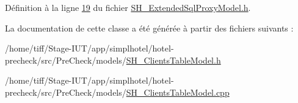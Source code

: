 Définition à la ligne \hyperlink{SH__ExtendedSqlProxyModel_8h_source_l00019}{19} du fichier \hyperlink{SH__ExtendedSqlProxyModel_8h_source}{S\-H\-\_\-\-Extended\-Sql\-Proxy\-Model.\-h}.



La documentation de cette classe a été générée à partir des fichiers suivants \-:\begin{DoxyCompactItemize}
\item 
/home/tiff/\-Stage-\/\-I\-U\-T/app/simplhotel/hotel-\/precheck/src/\-Pre\-Check/models/\hyperlink{SH__ClientsTableModel_8h}{S\-H\-\_\-\-Clients\-Table\-Model.\-h}\item 
/home/tiff/\-Stage-\/\-I\-U\-T/app/simplhotel/hotel-\/precheck/src/\-Pre\-Check/models/\hyperlink{SH__ClientsTableModel_8cpp}{S\-H\-\_\-\-Clients\-Table\-Model.\-cpp}\end{DoxyCompactItemize}
